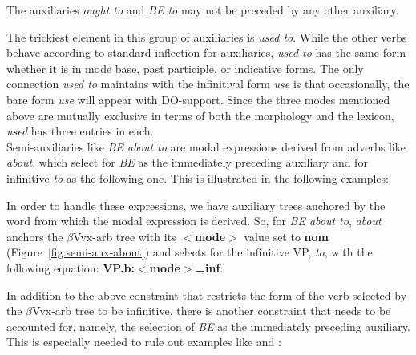 The auxiliaries {\it ought to} and {\it BE to} may not be preceded by any other
auxiliary.  


The trickiest element in this group of auxiliaries is {\it used to}.  While the
other verbs behave according to standard inflection for auxiliaries, {\it used
to} has the same form whether it is in mode base, past participle, or
indicative forms.  The only connection {\it used to} maintains with the
infinitival form {\it use} is that occasionally, the bare form {\it use} will
appear with DO-support.  Since the three modes mentioned above are mutually
exclusive in terms of both the morphology and the lexicon, {\it used} has three
entries in each.\\ 

Semi-auxiliaries like {\it BE about to} are modal expressions derived from
adverbs like {\it about}, which select for {\it BE} as the immediately
preceding auxiliary and for infinitive {\it to} as the following one. This
is illustrated in the following examples:


In order to handle these expressions, we have auxiliary trees anchored by
the word from which the modal expression is derived. So, for {\it BE about
to}, {\it about} anchors the $\beta$Vvx-arb tree with its {\bf $<$mode$>$}
value set to {\bf nom} (Figure~\ref{fig:semi-aux-about}) and selects for
the infinitive VP, {\it to}, with the following equation: {\bf
VP.b:$<$mode$>$=inf}.

In addition to the above constraint that restricts the form of the verb
selected by the $\beta$Vvx-arb tree to be infinitive, there is another
constraint that needs to be accounted for, namely, the selection of {\it
BE} as the immediately preceding auxiliary. This is especially needed to
rule out examples like  and :


